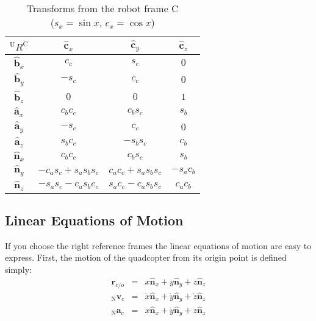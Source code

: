 \documentclass[lettersize,journal]{IEEEtran}
\begin{document}
\begin{table}[!t] \centering
  \caption{Transforms from the robot frame $\mathrm{C}$\\($s_x = \sin x$, $c_x = \cos x$)}
  \begin{tabular}{c|ccc}
    $^\mathrm{U}R^\mathrm{C}$ & $\mathbf{\hat{c}}_x$ & $\mathbf{\hat{c}}_y$ & $\mathbf{\hat{c}}_z$ \\
    \hline
    $\mathbf{\hat{b}}_x$ & $c_c$ & $s_c$ & $0$ \\
    $\mathbf{\hat{b}}_y$ & $-s_c$ & $c_c$ & $0$ \\
    $\mathbf{\hat{b}}_z$ & $0$ & $0$ & $1$ \\
    \hline
    $\mathbf{\hat{a}}_x$ & $c_b c_c$ & $c_b s_c$ & $s_b$ \\
    $\mathbf{\hat{a}}_y$ & $-s_c$ & $c_c$ & $0$ \\
    $\mathbf{\hat{a}}_z$ & $s_b c_c$ & $-s_b s_c$ & $c_b$ \\
    \hline
    $\mathbf{\hat{n}}_x$ & $c_b c_c$ & $c_b s_c$ & $s_b$ \\
    $\mathbf{\hat{n}}_y$ & $-c_a s_c + s_a s_b s_c$ & $c_a c_c + s_a s_b s_c$ & $-s_a c_b$ \\
    $\mathbf{\hat{n}}_z$ & $-s_a s_c-c_a s_b c_c$ & $s_a c_c - c_a s_b s_c$ & $c_a c_b$
  \end{tabular} \label{RobotTransforms}
\end{table}

\subsection{Linear Equations of Motion}
If you choose the right reference frames the linear equations of motion are easy to express. First, the motion of the quadcopter from its origin point is defined simply:
\begin{eqnarray}
  \mathbf{r}_{c/o} &=& x \mathbf{\hat{n}}_x + y \mathbf{\hat{n}}_y + z \mathbf{\hat{n}}_z \\
  {_\mathrm{N}\mathbf{v}_c} &=& \dot{x} \mathbf{\hat{n}}_x + \dot{y} \mathbf{\hat{n}}_y + \dot{z} \mathbf{\hat{n}}_z \\
  {_\mathrm{N}\mathbf{a}_c} &=& \ddot{x} \mathbf{\hat{n}}_x + \ddot{y} \mathbf{\hat{n}}_y + \ddot{z} \mathbf{\hat{n}}_z
\end{eqnarray}
\end{document}
